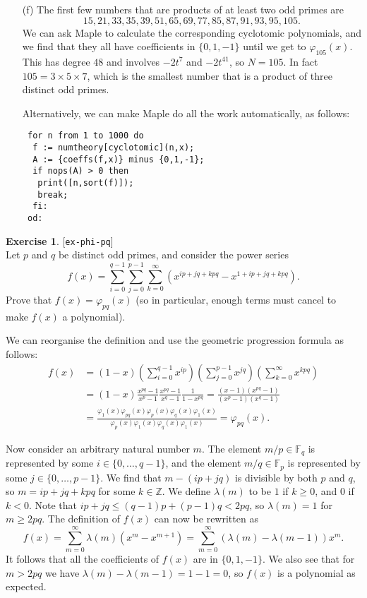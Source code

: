 \documentclass{amsart}
\newcommand{\Z}         {{\mathbb{Z}}}
\newcommand{\F}         {{\mathbb{F}}}
\newcommand{\lm}        {\lambda}
\newcommand{\vph}       {\varphi}
\newcommand{\tm}        {\times}
\renewcommand{\:}{\colon}
\newcommand{\lastexlabel}{}
\newcommand{\exlabel}[1]{
 \global\def\lastexlabel{#1}\label{#1}[\texttt{#1}]\ \\
}
\newcommand{\exlabel}[1]{
 \global\def\lastexlabel{#1}\label{#1}
}
\newenvironment{solution}{\SolutionInline}{\endSolutionInline}
\theoremstyle{definition}
\newtheorem{exercise}{Exercise}[section]
\renewenvironment{solution}{\SolutionAtEnd}{\endSolutionAtEnd}
\begin{document}
\begin{solution}
\begin{itemize}
  \item[(f)] The first few numbers that are products of at least two
   odd primes are 
   \[ 15, 21, 33, 35, 39, 51, 65, 69, 77, 85, 87, 91, 93, 95, 105.
   \]
   We can ask Maple to calculate the corresponding cyclotomic
   polynomials, and we find that they all have coefficients in
   $\{0,1,-1\}$ until we get to $\vph_{105}(x)$.  This has degree $48$
   and involves $-2t^7$ and $-2t^{41}$, so $N=105$.  In fact
   $105=3\tm 5\tm 7$, which is the smallest number that is a product
   of three distinct odd primes.

   Alternatively, we can make Maple do all the work automatically, as
   follows: 
\begin{verbatim}
 for n from 1 to 1000 do
  f := numtheory[cyclotomic](n,x);
  A := {coeffs(f,x)} minus {0,1,-1};
  if nops(A) > 0 then
   print([n,sort(f)]);
   break;
  fi:
 od:
\end{verbatim}
 \end{itemize}
\end{solution}

\begin{exercise}\exlabel{ex-phi-pq}
 Let $p$ and $q$ be distinct odd primes, and consider the power series 
 \[ f(x) = \sum_{i=0}^{q-1}\sum_{j=0}^{p-1}\sum_{k=0}^\infty
            (x^{ip+jq+kpq}-x^{1+ip+jq+kpq}).
 \]
 Prove that $f(x)=\vph_{pq}(x)$ (so in particular, enough terms must
 cancel to make $f(x)$ a polynomial).
\end{exercise}
\begin{solution}
 We can reorganise the definition and use the geometric progression
 formula as follows:
 \begin{align*}
   f(x) &= (1-x)\left(\sum_{i=0}^{q-1}x^{ip}\right)
                \left(\sum_{j=0}^{p-1}x^{jq}\right)
                \left(\sum_{k=0}^\infty x^{kpq}\right) \\
   &= (1-x)\frac{x^{pq}-1}{x^p-1}
       \frac{x^{pq}-1}{x^q-1}\frac{1}{1-x^{pq}} 
    = \frac{(x-1)(x^{pq}-1)}{(x^p-1)(x^q-1)} \\
   &= \frac{\vph_1(x)\vph_{pq}(x)\vph_p(x)\vph_q(x)\vph_1(x)}
           {\vph_p(x)\vph_1(x)\vph_q(x)\vph_1(x)} 
    = \vph_{pq}(x).
 \end{align*}

 Now consider an arbitrary natural number $m$.  The element
 $m/p\in\F_q$ is represented by some $i\in\{0,\dotsc,q-1\}$, and the
 element $m/q\in\F_p$ is represented by some $j\in\{0,\dotsc,p-1\}$.
 We find that $m-(ip+jq)$ is divisible by both $p$ and $q$, so
 $m=ip+jq+kpq$ for some $k\in\Z$.  We define $\lm(m)$ to be $1$ if
 $k\geq 0$, and $0$ if $k<0$.  Note that $ip+jq\leq(q-1)p+(p-1)q<2pq$,
 so $\lm(m)=1$ for $m\geq 2pq$.  The definition of $f(x)$ can now be
 rewritten as 
 \[ f(x) = \sum_{m=0}^\infty \lm(m)(x^m-x^{m+1}) = 
     \sum_{m=0}^\infty (\lm(m)-\lm(m-1)) x^m.
 \]
 It follows that all the coefficients of $f(x)$ are in $\{0,1,-1\}$.
 We also see that for $m>2pq$ we have $\lm(m)-\lm(m-1)=1-1=0$, so
 $f(x)$ is a polynomial as expected.
\end{solution}
\end{document}
